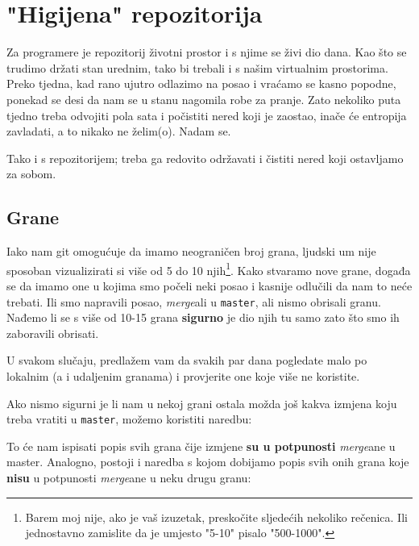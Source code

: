 \chapter*{"Higijena" repozitorija}

Za programere je repozitorij životni prostor i s njime se živi dio dana.
Kao što se trudimo držati stan urednim, tako bi trebali i s našim virtualnim prostorima.
Preko tjedna, kad rano ujutro odlazimo na posao i vraćamo se kasno popodne, ponekad se desi da nam se u stanu nagomila robe za pranje.
Zato nekoliko puta tjedno treba odvojiti pola sata i počistiti nered koji je zaostao, inače će entropija zavladati, a to nikako ne želim(o).
Nadam se.

Tako i s repozitorijem; treba ga redovito održavati i čistiti nered koji ostavljamo za sobom.

\section*{Grane}

Iako nam git omogućuje da imamo neograničen broj grana, ljudski um nije sposoban vizualizirati si više od 5 do 10 njih\footnote{Barem moj nije, ako je vaš izuzetak, preskočite sljedećih nekoliko rečenica. Ili jednostavno zamislite da je umjesto "5-10" pisalo "500-1000".}.
Kako stvaramo nove grane, događa se da imamo one u kojima smo počeli neki posao i kasnije odlučili da nam to neće trebati.
Ili smo napravili posao, \emph{merge}ali u \verb+master+, ali nismo obrisali granu.
Nađemo li se s više od 10-15 grana \textbf{sigurno} je dio njih tu samo zato što smo ih zaboravili obrisati.

U svakom slučaju, predlažem vam da svakih par dana pogledate malo po lokalnim (a i udaljenim granama) i provjerite one koje više ne koristite.

Ako nismo sigurni je li nam u nekoj grani ostala možda još kakva izmjena koju treba vratiti u \verb+master+, možemo koristiti naredbu:


To će nam ispisati popis svih grana čije izmjene \textbf{su u potpunosti} \emph{merge}ane u master. 
Analogno, postoji i naredba s kojom dobijamo popis svih onih grana koje \textbf{nisu} u potpunosti \emph{merge}ane u neku drugu granu:




